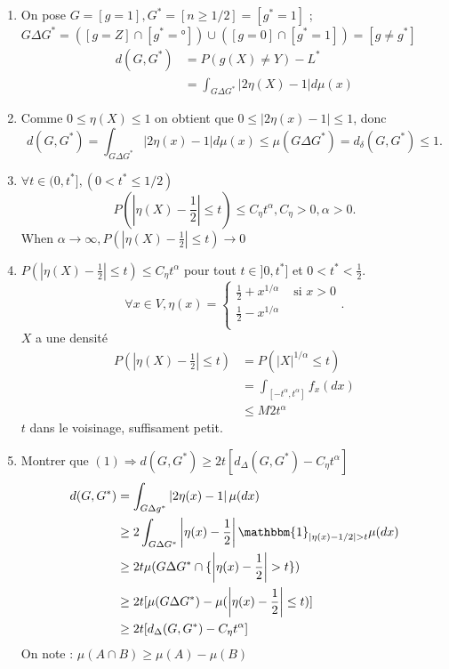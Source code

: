 \documentclass{article}
\theoremstyle{plain}%
\theoremstyle{definition}
\theoremstyle{remark}
\begin{document}
\begin{enumerate}
    \item On pose $ G = [ g = 1], G^* = [n \geq 1/2] = [g^* = 1] $ ; $ G \Delta G^* = ([g = Z] \cap  [ g^* = °]) \cup ([g = 0] \cap  [ g^* = 1]) = [g \neq g^*]$   
    \begin{align*}
        d(G, G^*) &= P(g(X) \neq Y)- L^* \\
            &= \int_{G \Delta G^* }^{} \left| 2 \eta (X) - 1 \right| d \mu (x)
    \end{align*}
    
    \item Comme $ 0 \leq \eta (X) \leq 1 $ on obtient que $ 0 \leq  \left| 2 \eta (x) - 1  \right| \leq 1 $, donc 
    \[
        d(G, G^*) = \int_{G \Delta G^*}^{} \left| 2 \eta (x) - 1 \right| d \mu (x) \leq  \mu (G \Delta  G^*) = d_{\delta } (G , G^*) \leq 1
    .\]
    
    \item $ \forall t \in (0, t^*], (0 < t^* \leq 1/2) $ 
    \[
        P(\left| \eta (X) - \frac{1}{2} \right| \leq t) \leq C_\eta  t ^\alpha, C_\eta > 0, \alpha > 0
    .\]
    When $ \alpha \to \infty, P(\left| \eta (X) - \frac{1}{2} \right| \leq t) \to 0  $ 
    
    \item $ P( \left| \eta (X) - \frac{1}{2} \right| \leq t ) \leq C_\eta t^\alpha  $ pour tout $ t \in ]0, t^*] $ et $ 0 < t^* < \frac{1}{2} $.
    \[
        \forall x \in V, \eta (x) = \begin{cases}
            \frac{1}{2} + x^{1 / \alpha } &\text{ si } x > 0\\
            \frac{1}{2} - x^{1 / \alpha }&\text{}\\
        \end{cases} 
    .\]
    $ X $  a une densité 
    \begin{align*}
    P ( \left| \eta (X) - \frac{1}{2} \right| \leq t) &= P(\left| X \right| ^{1/\alpha } \leq t) \\
        &= \int_{[-t^\alpha , t^\alpha ]}^{} f_x(dx) \\
        & \leq M 2 t^\alpha 
    \end{align*}
    $ t $ dans le voisinage, suffisament petit.
    
    \item Montrer que $ (1) \Rightarrow d(G, G^*) \geq  2 t [ d_\Delta (G, G^*) - C_\eta t^\alpha ] $ 
    \begin{align*}
        d(G, G^*) &= \int_{G \Delta g^*}^{}\left| 2 \eta (x) - 1 \right| \mu (dx) \\
        &\geq 2 \int_{G \Delta G^*}^{}\left| \eta (x) - \frac{1}{2} \right| \mathbbm{1}_{\left| \eta (x) - 1/2 \right| > t} \mu (dx) \\
        &\geq 2 t \mu (G \Delta G^* \cap \{\left| \eta (x) - \frac{1}{2} \right| > t \}) \\
        & \geq 2 t [ \mu (G \Delta G^*) - \mu (\left| \eta (x) - \frac{1}{2} \right| \leq t)] \\
        &\geq 2 t [ d_\Delta (G, G^*) - C_\eta t^\alpha ]
    \end{align*}
    On note : $ \mu (A \cap B) \geq \mu (A) - \mu (B) $ 
    

\end{enumerate}
\end{document}
